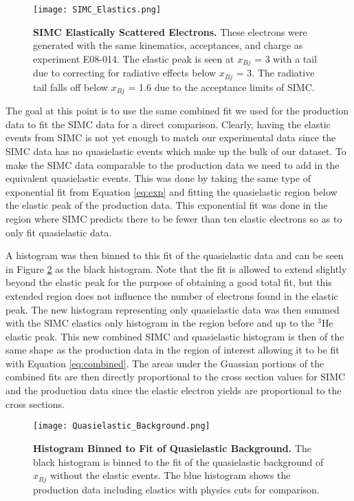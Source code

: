 \begin{figure}[!ht]
\begin{center}
\texttt{[image: SIMC\_Elastics.png]}
\end{center}
\caption[SIMC Elastically Scattered Electrons]{
{\bf{SIMC Elastically Scattered Electrons.}} These electrons were generated with the same kinematics, acceptances, and charge as experiment E08-014. The elastic peak is seen at $x_{Bj}$ = 3 with a tail due to correcting for radiative effects below $x_{Bj}$ = 3. The radiative tail falls off below $x_{Bj}$ = 1.6 due to the acceptance limits of SIMC.}
\label{fig:simc_elastics}
\end{figure}

The goal at this point is to use the same combined fit we used for the production data to fit the SIMC data for a direct comparison. Clearly, having the elastic events from SIMC is not yet enough to match our experimental data since the SIMC data has no quasielastic events which make up the bulk of our dataset. To make the SIMC data comparable to the production data we need to add in the equivalent quasielastic events. This was done by taking the same type of exponential fit from Equation \ref{eq:exp} and fitting the quasielastic region below the elastic peak of the production data. This exponential fit was done in the region where SIMC predicts there to be fewer than ten elastic electrons so as to only fit quasielastic data. 

A histogram was then binned to this fit of the quasielastic data and can be seen in Figure \ref{fig:QE_background} as the black histogram. Note that the fit is allowed to extend slightly beyond the elastic peak for the purpose of obtaining a good total fit, but this extended region does not influence the number of electrons found in the elastic peak. The new histogram representing only quasielastic data was then summed with the SIMC elastics only histogram in the region before and up to the $^3$He elastic peak. This new combined SIMC and quasielastic histogram is then of the same shape as the production data in the region of interest allowing it to be fit with Equation \ref{eq:combined}. The areas under the Guassian portions of the combined fits are then directly proportional to the cross section values for SIMC and the production data since the elastic electron yields are proportional to the cross sections. 

\begin{figure}[!ht]
\begin{center}
\texttt{[image: Quasielastic\_Background.png]}
\end{center}
\caption[Histogram Binned to Fit of Quasielastic Background]{
{\bf{Histogram Binned to Fit of Quasielastic Background.}} The black histogram is binned to the fit of the quasielastic background of $x_{Bj}$ without the elastic events. The blue histogram shows the production data including elastics with physics cuts for comparison.}
\label{fig:QE_background}
\end{figure}

